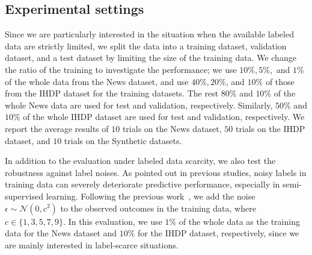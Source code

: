





\subsection{Experimental settings}
Since we are particularly interested in the situation when the available labeled data are strictly limited, we split the data into a training dataset, validation dataset, and a test dataset by limiting the size of the training data. 
We change the ratio of the training to investigate the performance; we use $10\%, 5\%,$ and $1\%$ of the whole data from the News dataset, and use $40\%, 20\%$, and $10\%$ of those from the IHDP dataset for the training datasets. 
The rest $80\%$ and $10\%$ of the whole News data are used for test and validation, respectively.
Similarly, $50\%$ and $10\%$ of the whole IHDP dataset are used for test and validation, respectively.
We report the average results of $10$ trials on the News dataset, $50$ trials on the IHDP dataset, and $10$ trials on the Synthetic datasets.


In addition to the evaluation under labeled data scarcity, we also test the robustness against label noises. 
As pointed out in previous studies, noisy labels in training data can severely deteriorate predictive performance, especially in semi-supervised learning.  
Following the previous  work~\cite{hill2011bayesian,johansson2016learning}, we add the noise $\epsilon\sim\mathcal{N}(0, c^2)$ to the observed outcomes in the training data, where $c \in \{1, 3, 5, 7, 9\}$.
In this evaluation, we use $1\%$ of the whole data as the training data for the News dataset and $10\%$  for the IHDP dataset, respectively, since we are mainly interested in label-scarce situations.



